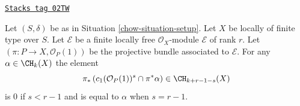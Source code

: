 \begin{lemma}
\label{chow-lemma-cap-projective-bundle}
\href{https://stacks.math.columbia.edu/tag/02TW}{\texttt{Stacks tag 02TW}}

Let $(S, \delta)$ be as in Situation \ref{chow-situation-setup}.
Let $X$ be locally of finite type over $S$.
Let $\mathcal{E}$ be a finite locally free $\mathcal{O}_X$-module
$\mathcal{E}$ of rank $r$. Let $(\pi : P \to X, \mathcal{O}_P(1))$
be the projective bundle associated to $\mathcal{E}$.
For any $\alpha \in \CH_k(X)$ the element
$$
\pi_*\left(
c_1(\mathcal{O}_P(1))^s \cap \pi^*\alpha
\right)
\in
\CH_{k + r - 1 - s}(X)
$$
is $0$ if $s < r - 1$ and is equal to $\alpha$ when $s = r - 1$.
\end{lemma}

